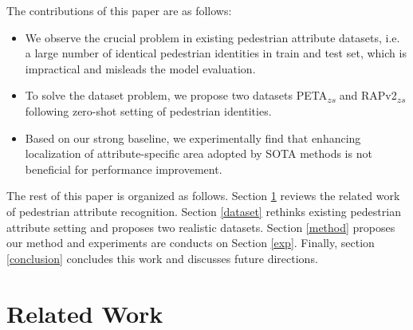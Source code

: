 \documentclass[runningheads]{llncs}
\begin{document}
The contributions of this paper are as follows:
 
\begin{itemize}
	\item We observe the crucial problem in existing pedestrian attribute datasets, i.e. a large number of identical pedestrian identities in train and test set, which is impractical and misleads the model evaluation.
	\item To solve the dataset problem, we propose two datasets PETA\textsubscript{$zs$} and RAPv2\textsubscript{$zs$} following zero-shot setting of pedestrian identities.
	\item Based on our strong baseline, we experimentally find that  enhancing localization of attribute-specific area adopted by SOTA methods is not beneficial for performance improvement. 
\end{itemize}

The rest of this paper is organized as follows. Section \ref{related_work} reviews the related work of pedestrian attribute recognition. Section \ref{dataset} rethinks existing pedestrian attribute setting and proposes two realistic datasets. Section \ref{method} proposes our method  and experiments are conducts on Section \ref{exp}. Finally, section \ref{conclusion} concludes this work and discusses future directions. 

\section{Related Work} \label{related_work}
\end{document}
